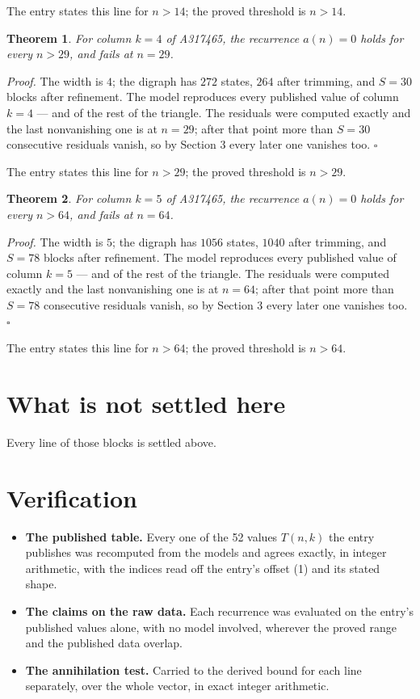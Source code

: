 \documentclass[11pt]{article}
\newtheorem{theorem}{Theorem}
\theoremstyle{definition}
\begin{document}
The entry states this line for $n > 14$; the proved threshold is $n > 14$.

\begin{theorem} For column $k = 4$ of A317465, the recurrence $a(n) = 0$ holds for every $n > 29$, and fails at $n = 29$.\end{theorem}

{\itshape Proof.} The width is $4$; the digraph has $272$ states, $264$ after trimming, and $S = 30$ blocks after refinement. The model reproduces every published value of column $k = 4$ --- and of the rest of the triangle. The residuals were computed exactly and the last nonvanishing one is at $n = 29$; after that point more than $S = 30$ consecutive residuals vanish, so by Section 3 every later one vanishes too. $\square$

The entry states this line for $n > 29$; the proved threshold is $n > 29$.

\begin{theorem} For column $k = 5$ of A317465, the recurrence $a(n) = 0$ holds for every $n > 64$, and fails at $n = 64$.\end{theorem}

{\itshape Proof.} The width is $5$; the digraph has $1056$ states, $1040$ after trimming, and $S = 78$ blocks after refinement. The model reproduces every published value of column $k = 5$ --- and of the rest of the triangle. The residuals were computed exactly and the last nonvanishing one is at $n = 64$; after that point more than $S = 78$ consecutive residuals vanish, so by Section 3 every later one vanishes too. $\square$

The entry states this line for $n > 64$; the proved threshold is $n > 64$.

\section{What is not settled here}

Every line of those blocks is settled above.

\section{Verification}

\begin{itemize}

\item {\bfseries The published table.} Every one of the 52 values $T(n,k)$ the entry publishes was recomputed from the models and agrees exactly, in integer arithmetic, with the indices read off the entry's offset (1) and its stated shape.

\item {\bfseries The claims on the raw data.} Each recurrence was evaluated on the entry's published values alone, with no model involved, wherever the proved range and the published data overlap.

\item {\bfseries The annihilation test.} Carried to the derived bound for each line separately, over the whole vector, in exact integer arithmetic.

\end{itemize}
\end{document}
